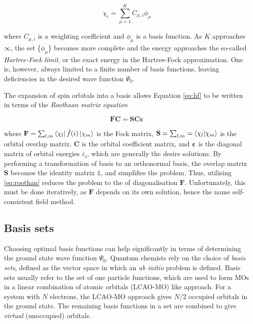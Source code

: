 \begin{equation}
\chi_i = \sum_{\mu=1}^K C_{\mu,i}\phi_{\mu}
\end{equation}

\noindent where $C_{\mu,i}$ is a weighting coefficient and $\phi_{\mu}$ is a basis function. As $K$ approaches $\infty$, the set \{$\phi_{\mu}$\} becomes more complete and the energy approaches the so-called \emph{Hartree-Fock limit}, or the exact energy in the Hartree-Fock approximation. One is, however, always limited to a finite number of basis functions, leaving deficiencies in the desired wave function $\Psi_0$.

The expansion of spin orbitals into a basis allows Equation \ref{eq:hf} to be written in terms of the \emph{Roothaan matrix equation}

\begin{equation}
\mathbf{F}\mathbf{C} = \mathbf{S}\mathbf{C}\mathbf{\varepsilon}
\label{eq:roothan}
\end{equation}

\noindent where $\mathbf{F} = \sum_{l,m} \bra{\chi_l} \hat{f}(i) \ket{\chi_m}$ is the Fock matrix, $\mathbf{S} = \sum_{l,m} = \bra{\chi_l}\ket{\chi_m}$ is the orbital overlap matrix. $\mathbf{C}$ is the orbital coefficient matrix, and $\mathbf{\varepsilon}$ is the diagonal matrix of orbital energies $\varepsilon_i$, which are generally the desire solutions. By performing a transformation of basis to an orthonormal basis, the overlap matrix $\mathbf{S}$ becomes the identity matrix $\mathbb{1}$, and simplifies the problem. Thus, utilising \ref{eq:roothan} reduces the problem to the of diagonalisation $\mathbf{F}$. Unfortunately, this must be done iteratively, as $\mathbf{F}$ depends on its own solution, hence the name self-consistent field method.

\subsection{Basis sets}

Choosing optimal basis functions can help significantly in terms of determining the ground state wave function $\Psi_0$. Quantum chemists rely on the choice of \emph{basis sets}, defined as the vector space in which an \emph{ab initio} problem is defined. Basis sets usually refer to the set of one particle functions, which are used to form MOs in a linear combination of atomic orbitals (LCAO-MO) like approach. For a system with $N$ electrons, the LCAO-MO approach gives $N$/2 occupied orbitals in the ground state. The remaining basis functions in a set are combined to give \emph{virtual} (unoccupied) orbitals.


